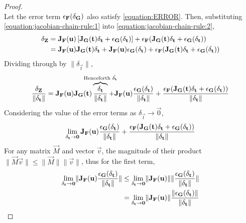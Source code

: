 \begin{lemma}
\begin{proof}
\begin{equation}
        \end{equation}
        Let the error term $\epsilon_{\mathbf{F}}(\delta_{\mathbf{G}})$ also satisfy \eqref{equation:ERROR}. Then, substituting \eqref{equation:jacobian-chain-rule:1} into \eqref{equation:jacobian-chain-rule:2},
        \begin{align*}
            \delta_{\mathbf{Z}}&=\mathbf{J}_{\mathbf{F}}(\mathbf{u})\left[\mathbf{J}_{\mathbf{G}}(\mathbf{t})\delta_{\mathbf{t}}+\epsilon_{\mathbf{G}}(\delta_{\mathbf{t}})\right]+\epsilon_{\mathbf{F}}(\mathbf{J}_{\mathbf{G}}(\mathbf{t})\delta_{\mathbf{t}}+\epsilon_{\mathbf{G}}(\delta_{\mathbf{t}}))\\
            &=\mathbf{J}_{\mathbf{F}}(\mathbf{u})\mathbf{J}_{\mathbf{G}}(\mathbf{t})\delta_{\mathbf{t}}+\mathbf{J}_{\mathbf{F}}(\mathbf{u})\epsilon_{\mathbf{G}}(\delta_{\mathbf{t}})+\epsilon_{\mathbf{F}}(\mathbf{J}_{\mathbf{G}}(\mathbf{t})\delta_{\mathbf{t}}+\epsilon_{\mathbf{G}}(\delta_{\mathbf{t}}))
        \end{align*}
        Dividing through by $\lVert\delta_\vec{t}\rVert$,
        $$
            \frac{\delta_\vec{Z}}{\lVert\delta_\vec{t}\rVert}=\jacobian_\fatf(\vec{u})\jacobian_\vec{G}(\vec{t})\overbrace{\frac{\delta_\vec{t}}{\lVert\delta_\vec{t}\rVert}}^{\text{\makebox[0pt]{Henceforth $\hat{\delta_\vec{t}}$}}}+\jacobian_\fatf(\vec{u})\frac{\epsilon_\vec{G}(\delta_\vec{t})}{\lVert\delta_\vec{t}\rVert}+\frac{\epsilon_\fatf(\jacobian_\vec{G}(\vec{t})\delta_\vec{t}+\epsilon_\vec{G}(\delta_\vec{t}))}{\lVert\delta_\vec{t}\rVert}
        $$
        Considering the value of the error terms as $\delta_\vec{t}\rightarrow\vec{0}$,
        $$
            \lim_{\delta_{\mathbf{t}}\rightarrow\mathbf{0}}\mathbf{J}_{\mathbf{F}}(\mathbf{u})\frac{\epsilon_{\mathbf{G}}(\delta_{\mathbf{t}})}{\lVert\delta_{\mathbf{t}}\rVert}+\frac{\epsilon_{\mathbf{F}}(\mathbf{J}_{\mathbf{G}}(\mathbf{t})\delta_{\mathbf{t}}+\epsilon_{\mathbf{G}}(\delta_{\mathbf{t}}))}{\lVert\delta_{\mathbf{t}}\rVert}
        $$
        For any matrix $\vec{M}$ and vector $\vec{v}$, the magnitude of their product $\lVert\vec{M}\vec{v}\rVert\leq\lVert\vec{M}\rVert\lVert\vec{v}\rVert$, thus for the first term,
        \begin{align*}
            \lim_{\delta_{\mathbf{t}}\rightarrow\mathbf{0}}\lVert\mathbf{J}_{\mathbf{F}}(\mathbf{u})\frac{\epsilon_{\mathbf{G}}(\delta_{\mathbf{t}})}{\lVert\delta_{\mathbf{t}}\rVert}\rVert&\leq\lim_{\delta_{\mathbf{t}}\rightarrow\mathbf{0}}\lVert\mathbf{J}_{\mathbf{F}}(\mathbf{u})\rVert\lVert\frac{\epsilon_{\mathbf{G}}(\delta_{\mathbf{t}})}{\lVert\delta_{\mathbf{t}}\rVert}\rVert\\
            &=\lim_{\delta_{\mathbf{t}}\rightarrow\mathbf{0}}\lVert\mathbf{J}_{\mathbf{F}}(\mathbf{u})\rVert\frac{\lVert\epsilon_{\mathbf{G}}(\delta_{\mathbf{t}})\rVert}{\lVert\delta_{\mathbf{t}}\rVert}
        \end{align*}

\end{proof}
\end{lemma}
